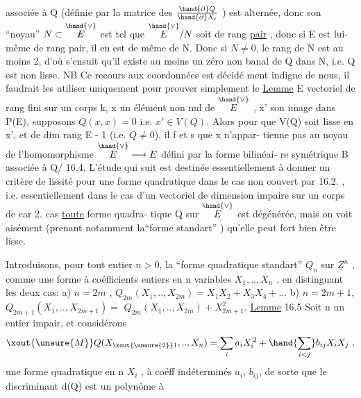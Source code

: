 
associée à Q (définie par la matrice des $\frac{\hand{\partial} Q}{\hand{\partial} X_i}$ ) est alternée, donc son
``noyau''  $N\subset\overset{\hand{\vee}}{E}$  est tel que  $\overset{\hand{\vee}}{E}/N$  soit de rang \uline{pair} , donc si E est lui-%
même de rang pair, il en est de même de N. Donc si $N\neq 0$, le rang de N
est au moins 2, d'où s'ensuit qu'il existe au moins un zéro non banal de
Q dans N, i.e. Q est non lisse.  NB Ce recours aux coordonnées est décidé
ment indigne de nous, il faudrait les utiliser uniquement pour prouver
simplement le
\uline{Lemme}  E vectoriel de rang fini sur un corps k,  x un élément non nul de
$\overset{\hand{\vee}}{E}$ ,  x' son image dans P(E), supposons  $Q(x,x) = 0$ i.e.
$x'\in V(Q)$. Alors pour que  V(Q) soit lisse en x',
et de dim  rang E - 1   (i.e. $Q\neq 0$), il f et s  que x n'appar-%
tienne pas au noyau de l'homomorphisme $\overset{\hand{\vee}}{E}\longrightarrow E$ défini par la forme bilinéai-%
re symétrique B associée à Q/
16.4.  L'étude qui suit est destinée essentiellement à 
donner un critère de lissité pour une forme quadratique dans le cas non
couvert par 16.2. , i.e. essentiellement dans le cas d'un vectoriel de
dimension impaire sur un corps de car 2.  cas \uline{toute} forme quadra-%
tique  Q  sur $\overset{\hand{\vee}}{E}$ est dégénérée, mais on voit aisément (prenant notamment
la``forme standart'' ) qu'elle peut fort bien être lisse.

Introduisons, pour tout entier  $n>0$, la ``forme quadratique standart''
$Q_n$ sur $\underline{Z}^n$ , comme une forme à coéfficients entiers en n variables
$X_1,..,X_n$ ,  en distinguant les deux cas:
a)  $n = 2m$  ,  $Q_{2m}(X_1,..,X_{2m}) = X_1X_2 + X_3X_4 + \ldots$
b)  $n = 2m+1$,  $Q_{2m+1}(X_1,..,X_{2m+1}) =$ $Q_{2m}(X_1,..,X_{2m}) + X_{2m+1}^2$.
\uline{Lemme} 16.5  Soit n un entier impair, et considérons
\[ \xout{\unsure{M}}Q(X_{\xout{\unsure{2}}1},..,X_n) = \sum_i a_iX_i^{\,2} + \hand{\sum_{i<j}} b_{ij}X_iX_j \ , \]
une forme quadratique en n  $X_i$ , à coéff indéterminés
$a_i$, $b_{ij}$, de sorte que le discriminant  d(Q)  est un polynôme à

